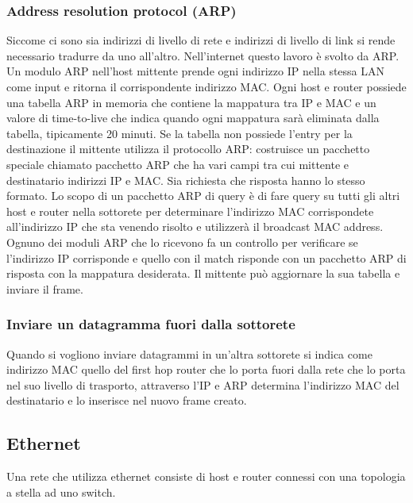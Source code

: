 \subsubsection{Address resolution protocol (ARP)}
Siccome ci sono sia indirizzi di livello di rete e indirizzi di livello di link si rende necessario tradurre da uno all'altro. Nell'internet questo lavoro \`e svolto da ARP. Un modulo ARP nell'host mittente prende ogni 
indirizzo IP nella stessa LAN come input e ritorna il corrispondente indirizzo MAC. Ogni host e router possiede una tabella ARP in memoria che contiene la mappatura tra IP e MAC e un valore di time-to-live che
indica quando ogni mappatura sar\`a eliminata dalla tabella, tipicamente 20 minuti. Se la tabella non possiede l'entry per la destinazione il mittente utilizza il protocollo ARP: costruisce un pacchetto speciale
chiamato pacchetto ARP che ha vari campi tra cui mittente e destinatario indirizzi IP e MAC. Sia richiesta che risposta hanno lo stesso formato. Lo scopo di un pacchetto ARP di query \`e di fare query su tutti gli 
altri host e router nella sottorete per determinare l'indirizzo MAC corrispondete all'indirizzo IP che sta venendo risolto e utilizzer\`a il broadcast MAC address. Ognuno dei moduli ARP che lo ricevono fa un 
controllo per verificare se l'indirizzo IP corrisponde e quello con il match risponde con un pacchetto ARP di risposta con la mappatura desiderata. Il mittente pu\`o aggiornare la sua tabella e inviare il frame. 
\subsubsection{Inviare un datagramma fuori dalla sottorete}
Quando si vogliono inviare datagrammi in un'altra sottorete si indica come indirizzo MAC quello del first hop router che lo porta fuori dalla rete che lo porta nel suo livello di trasporto, attraverso l'IP e ARP
determina l'indirizzo MAC del destinatario e lo inserisce nel nuovo frame creato. 
\subsection{Ethernet}
Una rete che utilizza ethernet consiste di host e router connessi con una topologia a stella ad uno switch. 
